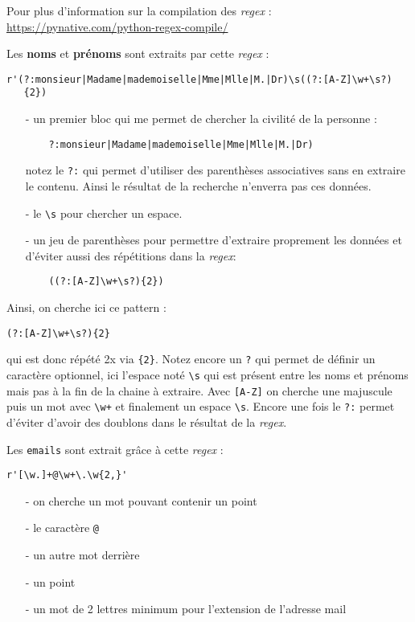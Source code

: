 \documentclass[a4paper,12pt]{article}
\begin{document}
Pour plus d'information sur la compilation des \textit{regex} : \url{https://pynative.com/python-regex-compile/}
\medskip

Les \textbf{noms} et \textbf{prénoms} sont extraits par cette \textit{regex} :
\begin{verbatim}
r'(?:monsieur|Madame|mademoiselle|Mme|Mlle|M.|Dr)\s((?:[A-Z]\w+\s?)
   {2})
\end{verbatim}
\medskip

\begin{itemize}
	\item[-] un premier bloc qui me permet de chercher la civilité de la personne : 
	\begin{verbatim}
	?:monsieur|Madame|mademoiselle|Mme|Mlle|M.|Dr)
	\end{verbatim}
	notez le \texttt{?:} qui permet d'utiliser des parenthèses associatives sans en extraire le contenu. Ainsi le résultat de la recherche n'enverra pas ces données.
	\item[-] le \texttt{\textbackslash{}s} pour chercher un espace.
	\item[-] un jeu de parenthèses pour permettre d'extraire proprement les données et d'éviter aussi des répétitions dans la \textit{regex}:
	\begin{verbatim}
	((?:[A-Z]\w+\s?){2})
	\end{verbatim}
\end{itemize}
\medskip

Ainsi, on cherche ici ce pattern : 
\begin{verbatim}
(?:[A-Z]\w+\s?){2}
\end{verbatim}
qui est donc répété 2x via \texttt{\{2\}}. Notez encore un \texttt{?} qui permet de définir un caractère optionnel, ici l'espace noté \texttt{\textbackslash{}s} qui est présent entre les noms et prénoms mais pas à la fin de la chaine à extraire. Avec \texttt{[A-Z]} on cherche une majuscule puis un mot avec \texttt{\textbackslash{}w+} et finalement un espace \texttt{\textbackslash{}s}. Encore une fois le \texttt{?:} permet d'éviter d'avoir des doublons dans le résultat de la \textit{regex}.
\medskip

Les \texttt{emails} sont extrait grâce à cette \textit{regex} :
\begin{verbatim}
r'[\w.]+@\w+\.\w{2,}'
\end{verbatim}
\begin{itemize}
	\item[-] on cherche un mot pouvant contenir un point
	\item[-] le caractère \og \texttt{@}\fg{}
	\item[-] un autre mot derrière
	\item[-] un point
	\item[-] un mot de 2 lettres minimum pour l'extension de l'adresse mail
\end{itemize}
\medskip
\end{document}
